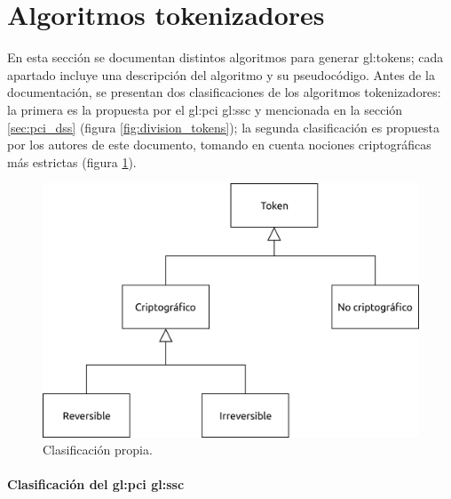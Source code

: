 %
%

\section{Algoritmos tokenizadores}
\label{sec:algoritmos}

En esta sección se documentan distintos algoritmos para generar
\glspl{gl:token}; cada apartado incluye una descripción del
algoritmo y su pseudocódigo. Antes de la documentación, se presentan
dos clasificaciones de los algoritmos tokenizadores: la primera es la propuesta
por el \gls{gl:pci} \gls{gl:ssc} y mencionada en la sección \ref{sec:pci_dss}
(figura \ref{fig:division_tokens}); la segunda clasificación es propuesta por
los autores de este documento, tomando en cuenta nociones criptográficas más
estrictas (figura \ref{fig:division_propia}).

\begin{figure}[h]
  \begin{center}
    \includegraphics[width=0.75\linewidth]
      {../../../../diagramas_comunes/clasificacion/clasificacion_propia.png}
    \caption{Clasificación propia.}
    \label{fig:division_propia}
  \end{center}
\end{figure}

\paragraph{Clasificación del
  \texorpdfstring{\acrlong{gl:pci}}{PCI} \texorpdfstring{\acrlong{gl:ssc}}{SSC}}

